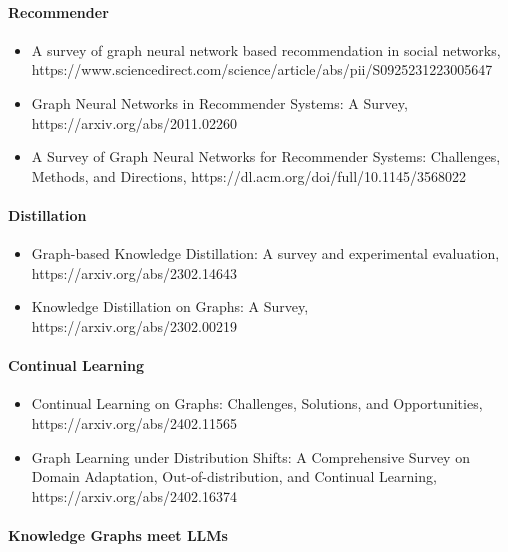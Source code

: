 \paragraph{Recommender}

\begin{itemize}
\item A survey of graph neural network based recommendation in social networks, https://www.sciencedirect.com/science/article/abs/pii/S0925231223005647

\item Graph Neural Networks in Recommender Systems: A Survey, https://arxiv.org/abs/2011.02260

\item A Survey of Graph Neural Networks for Recommender Systems: Challenges, Methods, and Directions, https://dl.acm.org/doi/full/10.1145/3568022
\end{itemize}

\paragraph{Distillation}

\begin{itemize}
\item Graph-based Knowledge Distillation: A survey and experimental evaluation, https://arxiv.org/abs/2302.14643

\item Knowledge Distillation on Graphs: A Survey, https://arxiv.org/abs/2302.00219
\end{itemize}

\paragraph{Continual Learning}

\begin{itemize}
\item Continual Learning on Graphs: Challenges, Solutions, and Opportunities, https://arxiv.org/abs/2402.11565

\item Graph Learning under Distribution Shifts: A Comprehensive Survey on Domain Adaptation, Out-of-distribution, and Continual Learning, https://arxiv.org/abs/2402.16374
\end{itemize}

\paragraph{Knowledge Graphs meet LLMs}

